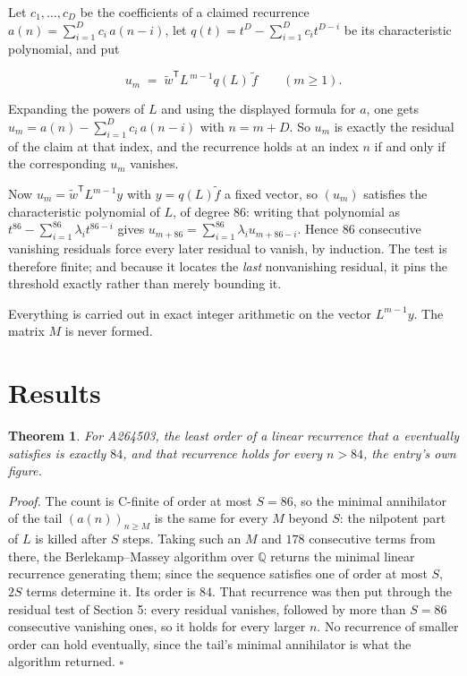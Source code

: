 \documentclass[11pt]{article}
\newtheorem{theorem}{Theorem}
\theoremstyle{definition}
\begin{document}
Let $c_1,\dots,c_D$ be the coefficients of a claimed recurrence $a(n) = \sum_{i=1}^{D} c_i\,a(n-i)$, let $q(t) = t^{D} - \sum_{i=1}^{D} c_i t^{D-i}$ be its characteristic polynomial, and put

\[u_m \;=\; \tilde w^{\mathsf T} L^{\,m-1} q(L)\,\tilde f \qquad (m \ge 1).\]

Expanding the powers of $L$ and using the displayed formula for $a$, one gets $u_m = a(n) - \sum_{i=1}^{D} c_i\,a(n-i)$ with $n = m + D$. So $u_m$ is exactly the residual of the claim at that index, and the recurrence holds at an index $n$ if and only if the corresponding $u_m$ vanishes.

Now $u_m = \tilde w^{\mathsf T} L^{m-1} y$ with $y = q(L)\tilde f$ a fixed vector, so $(u_m)$ satisfies the characteristic polynomial of $L$, of degree $86$: writing that polynomial as $t^{86} - \sum_{i=1}^{86} \lambda_i t^{86-i}$ gives $u_{m+86} = \sum_{i=1}^{86} \lambda_i u_{m+86-i}$. Hence $86$ consecutive vanishing residuals force every later residual to vanish, by induction. The test is therefore finite; and because it locates the {\itshape last} nonvanishing residual, it pins the threshold exactly rather than merely bounding it.

Everything is carried out in exact integer arithmetic on the vector $L^{m-1}y$. The matrix $M$ is never formed.

\section{Results}

\begin{theorem} For A264503, the least order of a linear recurrence that $a$ eventually satisfies is exactly $84$, and that recurrence holds for every $n > 84$, the entry's own figure.\end{theorem}

{\itshape Proof.} The count is C-finite of order at most $S = 86$, so the minimal annihilator of the tail $(a(n))_{n \ge M}$ is the same for every $M$ beyond $S$: the nilpotent part of $L$ is killed after $S$ steps. Taking such an $M$ and $178$ consecutive terms from there, the Berlekamp--Massey algorithm over $\mathbb{Q}$ returns the minimal linear recurrence generating them; since the sequence satisfies one of order at most $S$, $2S$ terms determine it. Its order is $84$. That recurrence was then put through the residual test of Section 5: every residual vanishes, followed by more than $S = 86$ consecutive vanishing ones, so it holds for every larger $n$. No recurrence of smaller order can hold eventually, since the tail's minimal annihilator is what the algorithm returned. $\square$
\end{document}
